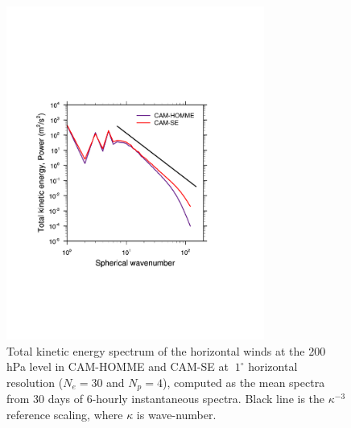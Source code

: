 \documentclass{agujournal}
\begin{document}
{\begin{figure}[h]
\centering
\includegraphics[width=20pc]{figs/kespectra.pdf}
\caption{Total kinetic energy spectrum of the horizontal winds at the 200 hPa level in CAM-HOMME and CAM-SE at $~1^\circ$ horizontal resolution ($N_e=30$ and $N_p=4$), computed as the mean spectra from 30 days of 6-hourly instantaneous spectra. Black line is the ${\kappa}^{-3}$ reference scaling, where $\kappa$ is wave-number.}
\label{fig:kespectra}
\end{figure}

}
\end{document}
